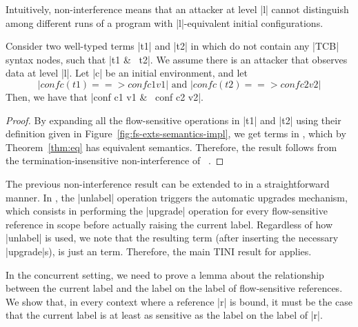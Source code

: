 Intuitively, non-interference means that an attacker at level |l|
cannot distinguish among different runs of a program with
|l|-equivalent initial configurations.

\begin{theorem}
  Consider two well-typed terms |t1| and |t2| in
  \liofs{} which do not contain any |TCB| syntax nodes, such that |t1 &~
  t2|. We assume there is an attacker that observes data at level
  |l|. Let |c| be an initial environment, and let
\[
    |conf c (t1) ==> conf c1 v1|\mbox{ and }
    |conf c (t2) ==> conf c2 v2|
\]
  Then, we have that |conf c1 v1 &~ conf c2 v2|.
\end{theorem}

\begin{proof}
  By expanding all the flow-sensitive operations in |t1| and |t2| using their
  definition given in Figure~\ref{fig:fs-exts-semantics-impl}, we get
  terms in \lio{}, which by Theorem~\ref{thm:eq} has equivalent
  semantics. Therefore, the result follows from the
  termination-insensitive non-interference of \lio{}~\citep{stefan:lio}.
\end{proof}

\begin{corollary}
  The previous non-interference result can be extended to \lioafs{} in
  a straightforward manner. In \lioafs{}, the |unlabel| operation
  triggers the automatic upgrades mechanism, which consists in
  performing the |upgrade| operation for every flow-sensitive
  reference in scope before actually raising the current label.
  Regardless of how |unlabel| is used, we note that the resulting term
  (after inserting the necessary |upgrade|s), is just an \liofs{}
  term. Therefore, the main TINI result for \liofs{} applies.


\end{corollary}

In the concurrent setting, we need to prove a lemma about the
relationship between the current label and the label on the label of
flow-sensitive references. We show that, in every context where a
reference |r| is bound, it must be the case that the current label is
at least as sensitive as the label on the label of |r|.

